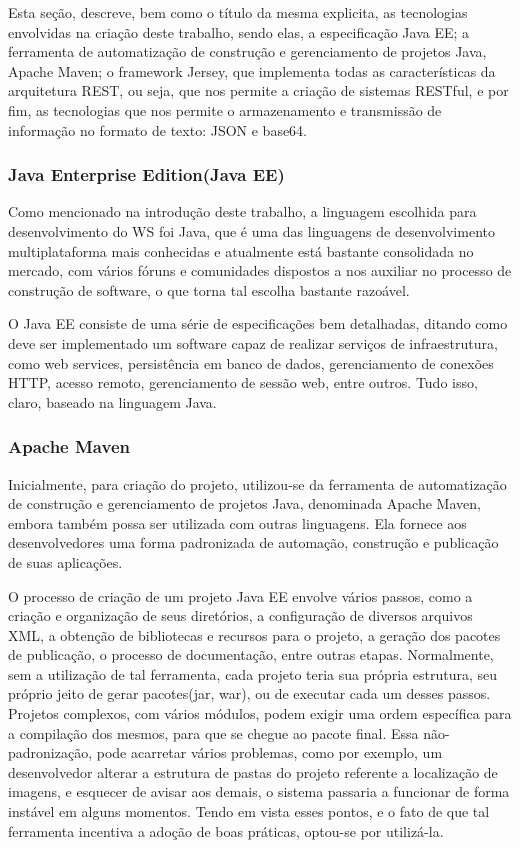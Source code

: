 \documentclass[12pt]{article}
\begin{document}
Esta seção, descreve, bem como o título da mesma explicita, as tecnologias envolvidas na criação deste trabalho, sendo elas, a especificação Java EE; a ferramenta de automatização de construção e gerenciamento de projetos Java, Apache Maven; o framework Jersey, que implementa todas as características da arquitetura REST, ou seja, que nos permite a criação de sistemas RESTful, e por fim, as tecnologias que nos permite o armazenamento e transmissão de informação no formato de texto: JSON e base64.

\subsubsection{Java Enterprise Edition(Java EE)}

Como mencionado na introdução deste trabalho, a linguagem escolhida para desenvolvimento do WS foi Java, que é uma das linguagens de desenvolvimento multiplataforma mais conhecidas e atualmente está bastante consolidada no mercado, com vários fóruns e comunidades dispostos a nos auxiliar no processo de construção de software, o que torna tal escolha bastante razoável. 

O Java EE consiste de uma série de especificações bem detalhadas, ditando como deve ser implementado um software capaz de realizar serviços de infraestrutura, como web services, persistência em banco de dados, gerenciamento de conexões HTTP, acesso remoto, gerenciamento de sessão web, entre outros. Tudo isso, claro, baseado na linguagem Java.

\subsubsection{Apache Maven}

Inicialmente, para criação do projeto, utilizou-se da ferramenta de automatização de construção e gerenciamento de projetos Java, denominada Apache Maven, embora também possa ser utilizada com outras linguagens. Ela fornece aos desenvolvedores uma forma padronizada de automação, construção e publicação de suas aplicações.

O processo de criação de um projeto Java EE envolve vários passos, como a criação e organização de seus diretórios, a configuração de diversos arquivos XML, a obtenção de bibliotecas e recursos para o projeto, a geração dos pacotes de publicação, o processo de documentação, entre outras etapas. Normalmente, sem a utilização de tal ferramenta, cada projeto teria sua própria estrutura, seu próprio jeito de gerar pacotes(jar, war), ou de executar cada um desses passos. Projetos complexos, com vários módulos, podem exigir uma ordem específica para a compilação dos mesmos, para que se chegue ao pacote final. Essa não-padronização, pode acarretar vários problemas, como por exemplo, um desenvolvedor alterar a estrutura de pastas do projeto referente a localização de imagens, e esquecer de avisar aos demais, o sistema passaria a funcionar de forma instável em alguns momentos. Tendo em vista esses pontos, e o fato de que tal ferramenta incentiva a adoção de boas práticas, optou-se por utilizá-la.
\end{document}
